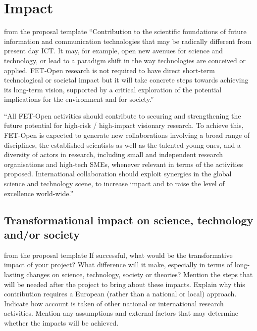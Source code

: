 \chapter{Impact}\label{chap:impact}
\begin{todo}{from the proposal template}
``Contribution to the scientific foundations of future information and communication technologies that
may be radically different from present day ICT. It may, for example, open new avenues for science and
technology, or lead to a paradigm shift in the way technologies are conceived or applied. FET-Open research is not required to have direct short-term technological or societal impact but it will take concrete
steps towards achieving its long-term vision, supported by a critical exploration of the potential implications for the environment and for society.''

``All FET-Open activities should contribute to securing and strengthening the future potential for high-risk / high-impact visionary research. To achieve this, FET-Open is expected to generate new collaborations involving a broad range of disciplines, the established scientists as well as the talented young ones, and a diversity of actors in research, including small and independent research organisations and high-tech SMEs, whenever relevant in terms of the activities proposed. International collaboration should exploit synergies in the global science and technology scene, to increase impact and to raise the level of excellence world-wide.''
\end{todo}
\section{Transformational impact on science, technology and/or society}\label{sec:transformational-impact}
\begin{todo}{from the proposal template}
      If successful, what would be the transformative impact of your project? What difference will it make, especially in terms of long-lasting changes on science, technology, society or theories? Mention the steps that will be needed after the project to bring about these impacts. Explain why this contribution requires a European (rather than a national or local) approach. Indicate how account is taken of other national or international research activities. Mention any assumptions and external factors that may determine whether the impacts will be achieved.
\end{todo}
